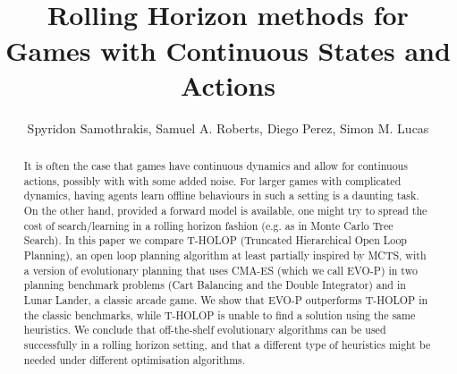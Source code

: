 \documentclass[conference]{IEEEtran}
\begin{document}
\title{\ \\ \LARGE\bf Rolling Horizon methods for Games with Continuous States and Actions } 

\author{Spyridon Samothrakis, Samuel A. Roberts, Diego Perez, Simon M. Lucas}


\maketitle


\begin{abstract}
It is often the case that games have continuous dynamics and allow for continuous actions, possibly with with some added noise. For larger games with complicated dynamics, having agents learn offline behaviours in such a setting is a daunting task. On the other hand, provided a forward model is available, one might try to spread the cost of search/learning in a rolling horizon fashion (e.g. as in Monte Carlo Tree Search). In this paper we compare T-HOLOP (Truncated Hierarchical Open Loop Planning), an open loop planning algorithm at least partially inspired by MCTS, with a version of evolutionary planning that uses CMA-ES (which we call EVO-P) in two planning benchmark problems (Cart Balancing and the Double Integrator) and in Lunar Lander, a classic arcade game. We show that EVO-P outperforms T-HOLOP in the classic benchmarks, while T-HOLOP is unable to find a solution using the same heuristics. We conclude that off-the-shelf evolutionary algorithms can be used successfully in a rolling horizon setting, and that a different type of heuristics might be needed under different optimisation algorithms. 

\end{abstract}

\end{document}
